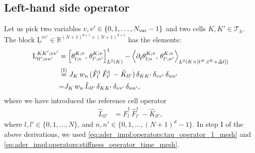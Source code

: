 \documentclass{scrreprt}
\theoremstyle{definition}
\theoremstyle{nonumberplain}
\newcommand{\laMat}[1]{\underline{\mathrm{#1}}}
\newcommand{\laMatel}[1]{\mathrm{#1}}
\newcommand{\tria}{\mathcal{T}_h}
\newcommand{\cell}{K}
\newcommand{\refCell}{\hat{\cell}}
\newcommand{\detJ}{J_\cell}
\begin{document}
\subsection{Left-hand side operator}
Let us pick two variables $v,v'\in\{0,1,\ldots,N_\textup{var}-1\}$
and two cells $\cell,\cell'\in\tria$.
The block
$\laMat{L}^{vv'}\in\mathbb{R}^{(N+1)^{d+1}\times(N+1)^{d+1}}$ has the elements:
\begin{align}
\laMatel{L}^{\cell\cell';vv'}_{ll';nn'}
&=
\left[\theta^{\cell;v}_{l;n},\,\theta^{\cell;v}_{l';n'}\right]^{1}_{L^2(\cell)}
-
\left\langle
\partial_{\hat{t}}\theta^{\cell;v}_{l;n},\,
\theta^{\cell;v}_{l';n'}
\right\rangle
_{L^2(\cell\times[t^\cell,t^\cell+\Delta t])}
\notag
\\
&
\overset{\textup{(I)}}
{=}
\detJ\,
w_{n}\,
(\hat{F}^1_{l}\,
\hat{F}^1_{l'}\,
-\refCell_{ll'})\,
\delta_{\cell\cell'}\,\delta_{vv'}\,
\delta_{n n'}
\notag
\\
&{=}
\detJ\,
w_{n}\,
\hat{L}_{ll'}\,
\delta_{\cell\cell'}\,\delta_{vv'}\,
\delta_{n n'},
\end{align}
where we have introduced the reference cell operator
\begin{align}
\hat{L}_{ll'}
&=
\hat{F}^1_{l}\,
\hat{F}^1_{l'}\,
-\refCell_{ll'},
\end{align}
where $l,l'\in\{0,1,\ldots,N\}$, and
$n,n'\in\{0,1,\ldots,(N+1)^{d}-1\}$.
In step I of the above derivations, we
used
\eqref{eq:ader_impl:operators:tau_operator_1_mesh}
and
\eqref{eq:ader_impl:operators:stiffness_operator_time_mesh}.
\end{document}

